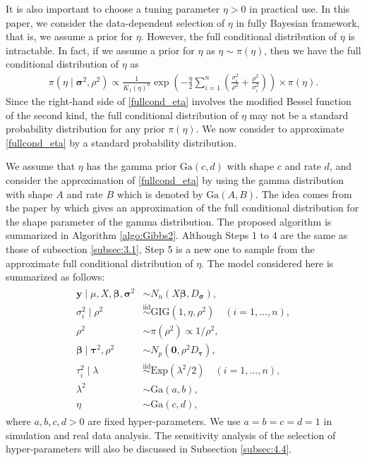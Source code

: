 \documentclass[11pt]{article}
\theoremstyle{plain}
\theoremstyle{definition}
\begin{document}
It is also important to choose a tuning parameter $\eta>0$ in practical use. In this paper, we consider the data-dependent selection of $\eta$ in fully Bayesian framework, that is, we assume a prior for $\eta$. However, the full conditional distribution of $\eta$ is intractable. In fact, if we assume a prior for $\eta$ as $\eta\sim \pi(\eta)$, then we have the full conditional distribution of $\eta$ as 
\begin{align}\label{fullcond_eta}
\pi(\eta\mid \bm{\sigma}^2,\rho^2)\propto \frac{1}{K_1(\eta)^n} \exp \left(-\frac{\eta}{2} \sum_{i=1}^n \left(\frac{\sigma_i^2}{\rho^2}+\frac{\rho^2}{\sigma_i^2}\right)\right)\times \pi(\eta).
\end{align}
Since the right-hand side of \eqref{fullcond_eta} involves the modified Bessel function of the second kind, the full conditional distribution of $\eta$ may not be a standard probability distribution for any prior $\pi(\eta)$. We now consider to approximate \eqref{fullcond_eta} by a standard probability distribution. 

We assume that $\eta$ has the gamma prior $\mathrm{Ga}(c,d)$ with shape $c$ and rate $d$, and consider the approximation of \eqref{fullcond_eta} by using the gamma distribution with shape $A$ and rate $B$ which is denoted by $\mathrm{Ga}(A,B)$. The idea comes from the paper by \cite{M19} which gives an approximation of the full conditional distribution for the shape parameter of the gamma distribution. The proposed algorithm is summarized in Algorithm \ref{algo:Gibbs2}. Although Steps 1 to 4 are the same as those of subsection \ref{subsec:3.1}, Step 5 is a new one to sample from the approximate full conditional distribution of $\eta$. The model considered here is summarized as follows:
\begin{align}\label{proposal}
\begin{split}
\bm{y} \mid \mu,X,\bm{\beta},\bm{\sigma}^2 & \sim N_n(X\bm{\beta}, D_{\bm{\sigma}}),\\
\sigma_i^2 \mid \rho^2 & \overset{\mathrm{iid}}{\sim} \mathrm{GIG}(1,\eta,\rho^2)\quad (i=1,\dots,n),\\
\rho^2 & \sim \pi(\rho^2)\propto 1/\rho^2,\\
\bm{\beta} \mid \bm{\tau}^2,\rho^2 &\sim N_p(\bm{0},\rho^2 D_{\bm{\tau}}),\\
\tau_i^2 \mid \lambda &\overset{\mathrm{iid}}{\sim} \mathrm{Exp}(\lambda^2/2) \quad (i=1,\dots,n),\\
\lambda^2 & \sim \mathrm{Ga}(a,b),\\
\eta &\sim \mathrm{Ga}(c,d),
\end{split}
\end{align}
where $a,b,c,d>0$ are fixed hyper-parameters. We use $a=b=c=d=1$ in simulation and real data analysis. The sensitivity analysis of the selection of hyper-parameters will also be discussed in Subsection \ref{subsec:4.4}. 
\end{document}
